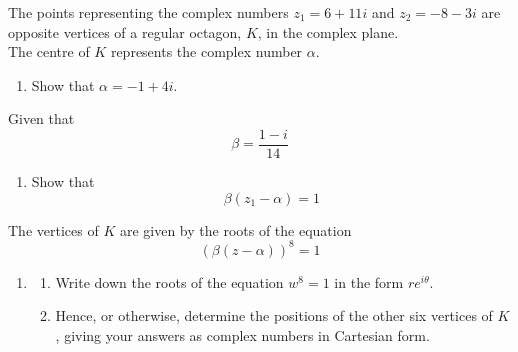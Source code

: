 \documentclass[leqno]{article}
\begin{document}
\begin{enumerate}[
  label=\textbf{\arabic*.},
  leftmargin=*,
  topsep=0pt,
  partopsep=0pt,
  parsep=0pt
]
\newpage

\questionitem

The points representing the complex numbers $z_1=6+11i$ and $z_2=-8-3i$ are opposite vertices of a regular octagon, $K$, in the complex plane. \\
The centre of $K$ represents the complex number $\alpha$. \\
\begin{enumerate}[label=\textbf{(\alph*)}]
  \item Show that $\alpha=-1+4i$.  \\
\end{enumerate}
Given that
\[
\beta=\frac{1-i}{14}
\]
\begin{enumerate}[label=\textbf{(\alph*)}, resume]
  \item Show that
  \[
  \beta(z_1-\alpha)=1
  \]
\end{enumerate}
The vertices of $K$ are given by the roots of the equation
\[
(\beta(z-\alpha))^8=1
\]
\begin{enumerate}[label=\textbf{(\alph*)}, resume]
  \item
  \begin{enumerate}[label=(\roman*)]
    \item Write down the roots of the equation $w^8=1$ in the form $re^{i\theta}$. 
    \item Hence, or otherwise, determine the positions of the other six vertices of $K$, giving your answers as complex numbers in Cartesian form.  \\
  \end{enumerate}
\end{enumerate}

\newpage


\questionitem


\end{enumerate}
\end{document}
